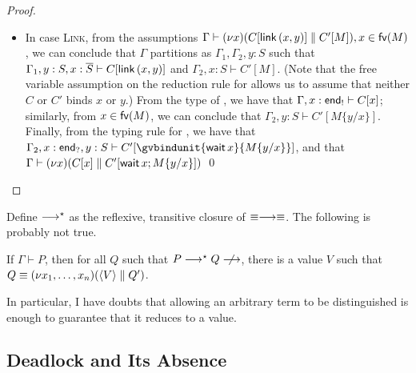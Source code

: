 \documentclass[orivec,envcountsame]{llncs}
\begin{document}
\begin{proof}
\begin{itemize}
  \item In case \textsc{Link}, from the assumptions $\Gamma \vdash (\nu x) (C[\mathsf{link} \,
    (x, y)] \parallel C'[M]), x \in \mathsf{fv}(M)$, we can conclude that $\Gamma$ partitions as
    $\Gamma_1,\Gamma_2,y:S$ such that $\Gamma_1,y:S,x:\overline{S} \vdash C[\mathsf{link} \, (x,
    y)]$ and $\Gamma_2,x:S \vdash C'[M]$.  (Note that the free variable assumption on the reduction
    rule for  allows us to assume that neither $C$ or $C'$ binds $x$ or $y$.)  From
    the type of , we have that $\Gamma,x:\mathsf{end}_! \vdash C[x]$; similarly, from $x \in
    \mathsf{fv}(M)$, we can conclude that $\Gamma_2,y:S \vdash C'[M\{y/x\}]$.  Finally, from the typing rule
    for , we have that $\Gamma_2,x:\interm,y:S \vdash C'[\gvbindunit{\gvconst{wait}
      \app x}{M\{y/x\}}]$, and that $\Gamma \vdash (\nu x)(C[x] \parallel
    C'[\mathsf{wait} \, x; M\{y/x\}])$ \qed
  \end{itemize}
\end{proof}

Define $\longrightarrow^\star$ as the reflexive, transitive closure of $\equiv\longrightarrow\equiv$.  The following
is probably not true.
\begin{theorem}\label{thm:normal-forms}
  If $\Gamma \vdash P$, then for all $Q$ such that $P \ceval^\star Q \centernot\ceval$, there is a
  value $V$ such that $Q \equiv (\nu x_1,\dots,x_n)(\langle V \rangle
  \parallel Q')$.
\end{theorem}
In particular, I have doubts that allowing an arbitrary term to be distinguished is enough to
guarantee that it reduces to a value.

\subsection{Deadlock and Its Absence}
\end{document}
